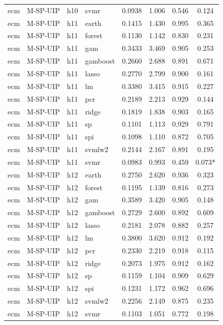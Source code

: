 \begin{ThreePartTable}
\begin{longtable}[t]{llclcccc}
ecm & M-SP-UIP & h10 & svmr & 0.0938 & 1.006 & 0.546 & 0.124\\
\addlinespace
ecm & M-SP-UIP & h11 & earth & 0.1415 & 1.430 & 0.995 & 0.365\\
ecm & M-SP-UIP & h11 & forest & 0.1130 & 1.142 & 0.830 & 0.231\\
ecm & M-SP-UIP & h11 & gam & 0.3433 & 3.469 & 0.905 & 0.253\\
ecm & M-SP-UIP & h11 & gamboost & 0.2660 & 2.688 & 0.891 & 0.671\\
ecm & M-SP-UIP & h11 & lasso & 0.2770 & 2.799 & 0.900 & 0.161\\
ecm & M-SP-UIP & h11 & lm & 0.3380 & 3.415 & 0.915 & 0.227\\
ecm & M-SP-UIP & h11 & pcr & 0.2189 & 2.213 & 0.929 & 0.144\\
ecm & M-SP-UIP & h11 & ridge & 0.1819 & 1.838 & 0.903 & 0.165\\
ecm & M-SP-UIP & h11 & sp & 0.1101 & 1.113 & 0.929 & 0.791\\
ecm & M-SP-UIP & h11 & spi & 0.1098 & 1.110 & 0.872 & 0.705\\
ecm & M-SP-UIP & h11 & svmlw2 & 0.2144 & 2.167 & 0.891 & 0.195\\
ecm & M-SP-UIP & h11 & svmr & 0.0983 & 0.993 & 0.459 & 0.073*\\
\addlinespace
ecm & M-SP-UIP & h12 & earth & 0.2750 & 2.620 & 0.936 & 0.323\\
ecm & M-SP-UIP & h12 & forest & 0.1195 & 1.139 & 0.816 & 0.273\\
ecm & M-SP-UIP & h12 & gam & 0.3589 & 3.420 & 0.905 & 0.148\\
ecm & M-SP-UIP & h12 & gamboost & 0.2729 & 2.600 & 0.892 & 0.609\\
ecm & M-SP-UIP & h12 & lasso & 0.2181 & 2.078 & 0.882 & 0.257\\
ecm & M-SP-UIP & h12 & lm & 0.3800 & 3.620 & 0.912 & 0.192\\
ecm & M-SP-UIP & h12 & pcr & 0.2330 & 2.219 & 0.918 & 0.115\\
ecm & M-SP-UIP & h12 & ridge & 0.2073 & 1.975 & 0.912 & 0.162\\
ecm & M-SP-UIP & h12 & sp & 0.1159 & 1.104 & 0.909 & 0.629\\
ecm & M-SP-UIP & h12 & spi & 0.1231 & 1.172 & 0.962 & 0.696\\
ecm & M-SP-UIP & h12 & svmlw2 & 0.2256 & 2.149 & 0.875 & 0.235\\
ecm & M-SP-UIP & h12 & svmr & 0.1103 & 1.051 & 0.772 & 0.198\\

\end{longtable}
\end{ThreePartTable}
